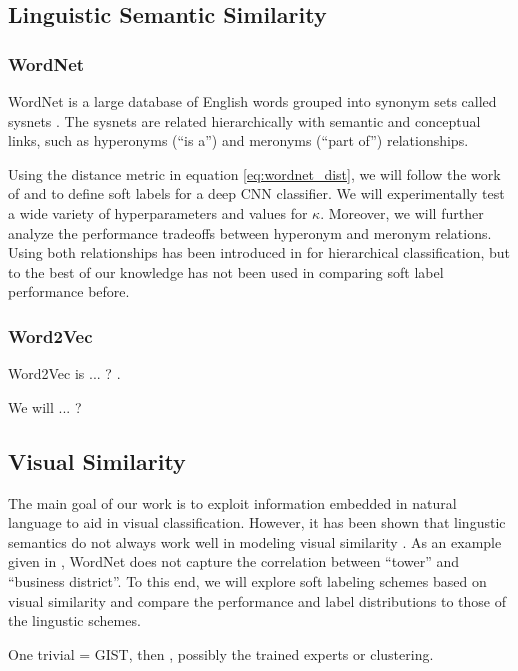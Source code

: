 \subsection{Linguistic Semantic Similarity}


\subsubsection{WordNet}

WordNet is a large database of English words grouped into synonym sets called
sysnets \cite{miller1995wordnet}.
The sysnets are related hierarchically with semantic and conceptual links, such
as hyperonyms (``is a'') and meronyms (``part of'') relationships.

Using the distance metric in equation \ref{eq:wordnet_dist}, we will follow the
work of \cite{fergus2010semantic} and \cite{zhao2011large} to define soft
labels for a deep CNN classifier. We will experimentally test a wide variety of
hyperparameters and values for $\kappa$.
Moreover, we will further analyze the performance tradeoffs between hyperonym
and meronym relations. Using both relationships has been introduced in
\cite{marszalek2007semantic} for hierarchical classification, but to the best
of our knowledge has not been used in comparing soft label performance before.


\subsubsection{Word2Vec}

Word2Vec is ... ? \cite{mikolov2013distributed}.

We will ... ?



\subsection{Visual Similarity}

The main goal of our work is to exploit information embedded in natural
language to aid in visual classification.
However, it has been shown that lingustic semantics do not always work well in
modeling visual similarity \cite{li2010building}. As an example given in
\cite{li2010building}, WordNet does not capture the correlation between
``tower'' and ``business district''.
To this end, we will explore soft labeling schemes based on visual similarity
and compare the performance and label distributions to those of the lingustic
schemes.

One trivial = GIST, then \cite{li2010building}, possibly the trained experts
or clustering.
